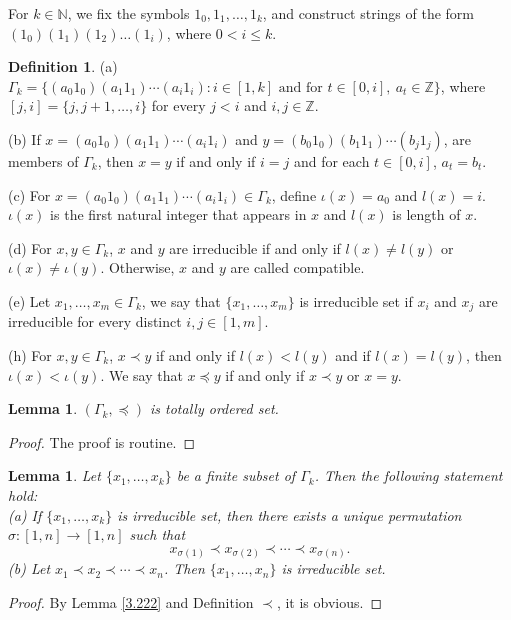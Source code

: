 \documentclass{amsart}
\newtheorem{lemma}[theorem]{Lemma}
\theoremstyle{definition}
\newtheorem{definition}[theorem]{Definition}
\theoremstyle{remark}
\numberwithin{equation}{section}
\begin{document}
For \( k \in \mathbb{N} \), we fix the symbols \( 1_0, 1_1, \ldots, 1_k \), and construct strings of the form \( (1_0)( 1_{1})( 1_{2}) \ldots (1_{i}) \), where $0<i\leq k$. 
\begin{definition}
	
	(a) \( \Gamma_k = \{ (a_0 1_0)(a_1 1_1) \cdots (a_i 1_i) : i \in [1, k] \text{ and for } t \in [0,i],\ a_t \in \mathbb{Z} \} \), where $[j,i]=\{j,j+1,\ldots,i\}$ for every $j<i$ and $i,j\in\mathbb{Z}$.
	
	(b) If \( x = (a_0 1_0)(a_1 1_1) \cdots (a_i 1_i) \) and \( y = (b_0 1_0)(b_1 1_1) \cdots (b_j 1_j) \), are members of \( \Gamma_k \), then 
	$
	x = y $ if and only if $i = j$ and for each  $t \in [0, i]$, $a_t = b_t$.
	
	(c) For \( x = (a_0 1_0)(a_1 1_1) \cdots (a_i 1_i) \in \Gamma_k \), define \( \iota(x) = a_0 \) and \( l(x) = i \). $\iota(x)$ is the first natural integer that appears in $x$ and $l(x)$ is length of $x$.
	
	(d) For \( x, y \in \Gamma_k \), $ x $ and $y$ are irreducible if and only if  $l(x)\neq l(y)$  or \( \iota(x)\neq\iota(y) \). Otherwise, $x$ and $y$ are called compatible. 
	
	(e) Let $x_1,\ldots,x_m\in \Gamma_k$, we say that $\{x_1,\ldots,x_m\}$ is irreducible set if $x_i$ and $x_j$ are irreducible for every distinct $i,j\in[1,m]$. 
	
	(h) For \( x, y \in \Gamma_k \), \( x \prec y \) if and only if \( l(x) < l(y) \) and if \( l(x)=l(y) \), then \( \iota(x) < \iota(y) \). We say that $x\preceq y$ if and only if $x\prec y$ or $x=y$.
\end{definition} 
\begin{lemma}{\label{3.222}}
	$(\Gamma_k,\preceq)$ is totally ordered set.
\end{lemma}
\begin{proof}
The proof is routine.	
\end{proof}
\begin{lemma}{\label{{3.33}}}
	Let $\{x_1,\ldots,x_k\}$ be a finite subset of $\Gamma_k$. Then the following statement hold: \\
	(a) If $\{x_1,\ldots,x_k\}$ is irreducible set, then there exists a unique permutation $\sigma:[1,n]\to[1,n]$ such that 
	\[
	x_{\sigma(1)}\prec x_{\sigma(2)}\prec\cdots\prec x_{\sigma(n)}.
	\]
	(b) Let $	x_{1}\prec x_{2}\prec\cdots\prec x_{n}$. Then $\{x_1,\ldots,x_n\}$ is irreducible set.
\end{lemma}
\begin{proof}
	By Lemma \ref{3.222} and Definition $\prec$, it is obvious.
\end{proof}
\end{document}

